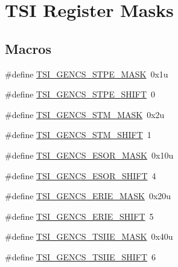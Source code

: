 \hypertarget{group___t_s_i___register___masks}{}\section{T\+SI Register Masks}
\label{group___t_s_i___register___masks}
\subsection*{Macros}
\begin{DoxyCompactItemize}
\item 
\#define \hyperlink{group___t_s_i___register___masks_ga83a2e8e8965873c67507422e6e9a9b8e}{T\+S\+I\+\_\+\+G\+E\+N\+C\+S\+\_\+\+S\+T\+P\+E\+\_\+\+M\+A\+SK}~0x1u
\item 
\#define \hyperlink{group___t_s_i___register___masks_gab11b995ab664e22700a2f67aa2b1a070}{T\+S\+I\+\_\+\+G\+E\+N\+C\+S\+\_\+\+S\+T\+P\+E\+\_\+\+S\+H\+I\+FT}~0
\item 
\#define \hyperlink{group___t_s_i___register___masks_ga490fa9afb2591596712216cc7031cd47}{T\+S\+I\+\_\+\+G\+E\+N\+C\+S\+\_\+\+S\+T\+M\+\_\+\+M\+A\+SK}~0x2u
\item 
\#define \hyperlink{group___t_s_i___register___masks_ga4e08b4560fff0d44559e8dd48afcb4b0}{T\+S\+I\+\_\+\+G\+E\+N\+C\+S\+\_\+\+S\+T\+M\+\_\+\+S\+H\+I\+FT}~1
\item 
\#define \hyperlink{group___t_s_i___register___masks_ga1036a1740b9fd85ac9a7ee8c7b31fbc5}{T\+S\+I\+\_\+\+G\+E\+N\+C\+S\+\_\+\+E\+S\+O\+R\+\_\+\+M\+A\+SK}~0x10u
\item 
\#define \hyperlink{group___t_s_i___register___masks_ga2cdb34b848a822afc459c74893200fbb}{T\+S\+I\+\_\+\+G\+E\+N\+C\+S\+\_\+\+E\+S\+O\+R\+\_\+\+S\+H\+I\+FT}~4
\item 
\#define \hyperlink{group___t_s_i___register___masks_gae3ff8b7a00a0f1e53fd4b454858eb366}{T\+S\+I\+\_\+\+G\+E\+N\+C\+S\+\_\+\+E\+R\+I\+E\+\_\+\+M\+A\+SK}~0x20u
\item 
\#define \hyperlink{group___t_s_i___register___masks_ga834b781dd182ceb57eff9de0ab0ef82a}{T\+S\+I\+\_\+\+G\+E\+N\+C\+S\+\_\+\+E\+R\+I\+E\+\_\+\+S\+H\+I\+FT}~5
\item 
\#define \hyperlink{group___t_s_i___register___masks_gac1aa80b1c251525e1811471e72c00254}{T\+S\+I\+\_\+\+G\+E\+N\+C\+S\+\_\+\+T\+S\+I\+I\+E\+\_\+\+M\+A\+SK}~0x40u
\item 
\#define \hyperlink{group___t_s_i___register___masks_ga1ce2a7ae1f44df3b88d3028b2453f9c0}{T\+S\+I\+\_\+\+G\+E\+N\+C\+S\+\_\+\+T\+S\+I\+I\+E\+\_\+\+S\+H\+I\+FT}~6

\end{DoxyCompactItemize}
